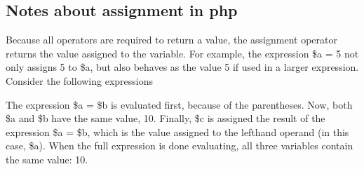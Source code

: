\documentclass{report}
\begin{document}
\pagebreak 
\subsection{Notes about assignment in php}
\bigbreak \noindent 
Because all operators are required to return a value, the assignment operator returns
the value assigned to the variable. For example, the expression \$a = 5 not only assigns
5 to \$a, but also behaves as the value 5 if used in a larger expression. Consider the
following expressions
\bigbreak \noindent 
{}
\bigbreak \noindent 
The expression \$a = \$b is evaluated first, because of the parentheses. Now, both \$a and
\$b have the same value, 10. Finally, \$c is assigned the result of the expression \$a = \$b,
which is the value assigned to the lefthand operand (in this case, \$a). When the full
expression is done evaluating, all three variables contain the same value: 10.

\bigbreak \noindent 
\end{document}
